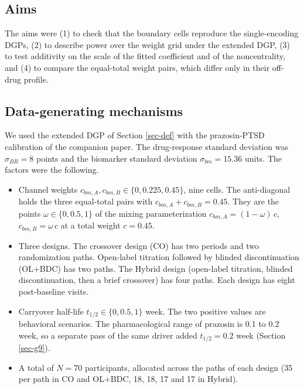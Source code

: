 \documentclass[
  11pt,
]{article}
\providecommand{\tightlist}{%
  \setlength{\itemsep}{0pt}\setlength{\parskip}{0pt}}
\begin{document}
\subsection{Aims}\label{aims}

The aims were (1) to check that the boundary cells reproduce the
single-encoding DGPs, (2) to describe power over the weight grid under
the extended DGP, (3) to test additivity on the scale of the fitted
coefficient and of the noncentrality, and (4) to compare the
equal-total weight pairs, which differ only in their off-drug
profile.

\subsection{Data-generating mechanisms}\label{data-generating-mechanisms}

We used the extended DGP of Section \ref{sec-def} with the
prazosin-PTSD calibration of the companion paper. The drug-response
standard deviation was \(\sigma_{BR} = 8\) points and the
biomarker standard deviation \(\sigma_{bm} = 15.36\)
units. The factors were the following.

\begin{itemize}
\tightlist
\item
  Channel weights \(c_{bm,A}, c_{bm,B} \in \{0, 0.225, 0.45\}\), nine
  cells. The anti-diagonal holds the three equal-total pairs with
  \(c_{bm,A} + c_{bm,B} = 0.45\). They are the points
  \(\omega \in \{0, 0.5, 1\}\) of the mixing parameterization
  \(c_{bm,A} = (1 - \omega)\,c\), \(c_{bm,B} = \omega\, c\) at a total
  weight \(c = 0.45\).
\item
  Three designs. The crossover design (CO) has two periods and two
  randomization paths. Open-label titration followed by blinded
  discontinuation (OL+BDC) has two paths. The Hybrid design
  (open-label titration, blinded discontinuation, then a brief
  crossover) has four paths. Each design has eight post-baseline
  visits.
\item
  Carryover half-life \(t_{1/2} \in \{0, 0.5, 1\}\) week. The two
  positive values are behavioral scenarios. The pharmacological range
  of prazosin is 0.1 to 0.2 week, so a separate pass of the same driver
  added \(t_{1/2} = 0.2\) week (Section \ref{sec-g9}).
\item
  A total of \(N = 70\) participants, allocated across the paths of each
  design (35 per path in CO and OL+BDC, 18, 18, 17 and 17 in Hybrid).
\end{itemize}
\end{document}

